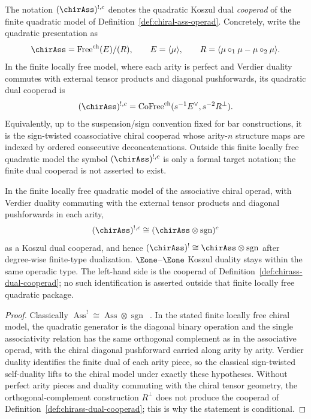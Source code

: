 \begin{definition}
\label{def:chirass-dual-cooperad}
The notation \((\chirAss)^{!,c}\) denotes the quadratic Koszul dual
\emph{cooperad} of the finite quadratic model of
Definition~\ref{def:chiral-ass-operad}. Concretely, write the
quadratic presentation as
\[
\chirAss=\operatorname{Free}^{\mathrm{ch}}(E)/(R),
\qquad
E=\langle\mu\rangle,\qquad
R=\langle\mu\circ_1\mu-\mu\circ_2\mu\rangle .
\]
In the finite locally free model, where each arity is perfect and
Verdier duality commutes with external tensor products and diagonal
pushforwards, its quadratic dual cooperad is
\[
(\chirAss)^{!,c}
=\operatorname{CoFree}^{\mathrm{ch}}(s^{-1}E^\vee,s^{-2}R^\perp).
\]
Equivalently, up to the suspension/sign convention fixed for bar
constructions, it is the sign-twisted coassociative chiral cooperad
whose arity-\(n\) structure maps are indexed by ordered consecutive
deconcatenations. Outside this finite locally free quadratic model the
symbol \((\chirAss)^{!,c}\) is only a formal target notation; the
finite dual cooperad is not asserted to exist.
\end{definition}

\begin{proposition}
\label{prop:chirAss-self-dual}
In the finite locally free quadratic model of the associative
chiral operad, with Verdier duality commuting with the external
tensor products and diagonal pushforwards in each arity,
\[
(\chirAss)^{!,c}
\cong
(\chirAss \otimes \operatorname{sgn})^c
\]
as a Koszul dual cooperad, and hence
$(\chirAss)^! \cong \chirAss \otimes \operatorname{sgn}$ after
degree-wise finite-type dualization.
$\Eone$--$\Eone$ Koszul duality stays within the same operadic
type. The left-hand side is the cooperad of
Definition~\ref{def:chirass-dual-cooperad}; no such identification is
asserted outside that finite locally free quadratic package.
\end{proposition}
\begin{proof}
Classically $\operatorname{Ass}^! \cong \operatorname{Ass} \otimes
\operatorname{sgn}$~\cite[Theorem~7.4.1]{LV12}. In the stated
finite locally free chiral model, the quadratic generator is the
diagonal binary operation and the single associativity relation
has the same orthogonal complement as in the associative operad,
with the chiral diagonal pushforward carried along arity by
arity. Verdier duality identifies the finite dual of each arity
piece, so the classical sign-twisted self-duality lifts to the
chiral model under exactly these hypotheses. Without perfect arity
pieces and duality commuting with the chiral tensor geometry, the
orthogonal-complement construction \(R^\perp\) does not produce the
cooperad of Definition~\ref{def:chirass-dual-cooperad}; this is why
the statement is conditional.
\end{proof}

